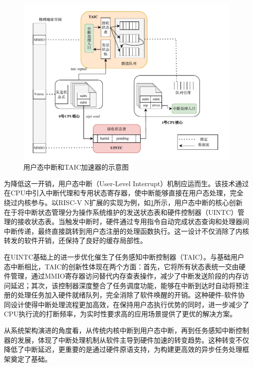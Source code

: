 \begin{figure}[htbp]
    \centering
    \includegraphics[width=1.0\textwidth]{figures/uintc_taic.pdf}
    \caption{用户态中断和TAIC加速器的示意图}\label{fig:uintc_taic}
\end{figure}

为降低这一开销，用户态中断（User-Level Interrupt）\cite{mehta2021x86}机制应运而生。该技术通过在CPU中引入中断代理和专用状态寄存器，使中断能够直接在用户态处理，完全绕过内核参与。以RISC-V N扩展的实现为例，如\ref{fig:uintc_taic}所示，用户态中断的核心创新在于将中断状态管理分为操作系统维护的发送状态表和硬件控制器（UINTC）管理的接收状态表。当触发中断时，硬件通过专用指令自动完成状态查询和处理器间中断传递，最终直接跳转到用户态注册的处理函数执行。这一设计不仅消除了内核转发的软件开销，还保持了良好的缓存局部性。


在UINTC基础上的进一步优化催生了任务感知中断控制器（TAIC）\cite{taic_github}。与基础用户态中断相比，TAIC的创新性体现在两个方面：首先，它将所有状态表统一交由硬件管理，通过MMIO寄存器访问替代内存查表操作，减少了中断发送阶段的内存访问延迟；其次，该控制器深度整合了任务调度功能，能够在中断到达时自动将预注册的处理任务加入硬件就绪队列，完全消除了软件唤醒的开销。这种硬件-软件协同设计使得中断处理流程更加高效，在保持用户态执行优势的同时，进一步减少了CPU执行流的打断频率，为实时性要求高的应用场景提供了更优的解决方案。

从系统架构演进的角度看，从传统内核中断到用户态中断，再到任务感知中断控制器的发展，体现了中断处理机制从软件主导到硬件加速的转变趋势\cite{song2021hardware}。这种转变不仅降低了中断延迟，更重要的是通过硬件原语支持，为构建更高效的异步任务处理框架奠定了基础。


